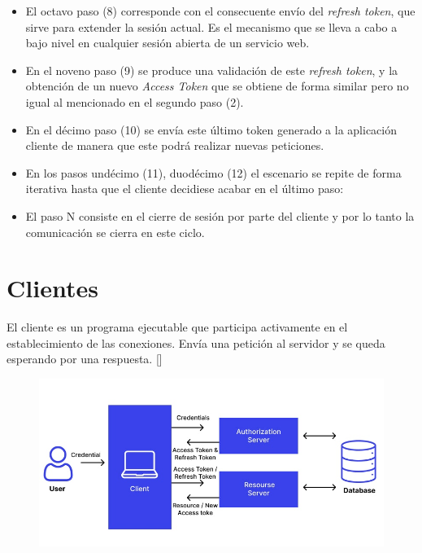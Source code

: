 \begin{itemize}
	\item El octavo paso (8) corresponde con el consecuente envío del \textit{refresh token}, que sirve para extender la sesión actual. Es el mecanismo que se lleva a cabo a bajo nivel en cualquier sesión abierta de un servicio web.
	
	\item En el noveno paso (9) se produce una validación de este \textit{refresh token}, y la obtención de un nuevo \textit{Access Token} que se obtiene de forma similar pero no igual al mencionado en el segundo paso (2). 
	
	\item En el décimo paso (10) se envía este último token generado a la aplicación cliente de manera que este podrá realizar nuevas peticiones. 
	
	\item En los pasos undécimo (11), duodécimo (12) el escenario se repite de forma
	iterativa hasta que el cliente decidiese acabar en el último paso: 
	
	\item El paso N consiste en el cierre de sesión por parte del cliente y por lo tanto la comunicación se cierra en este ciclo. 
	
\end{itemize}


\section*{Clientes}
El cliente es un programa ejecutable que participa activamente en el establecimiento de las conexiones. Envía una petición al servidor y se queda esperando por una respuesta. [\cite{lizama2016redes}]

\begin{figure}[H]
	\centering
	\includegraphics[width=0.9\linewidth]{Graphics/token-based-auth}
	\caption{}
	\label{fig:token-based-auth}
\end{figure}

